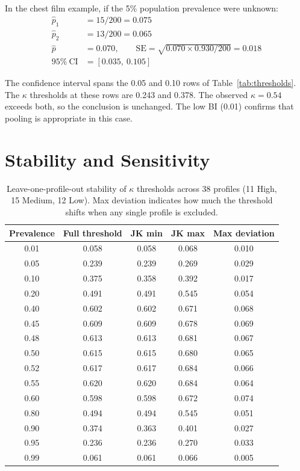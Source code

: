 \documentclass[11pt]{article}
\begin{document}
In the chest film example, if the 5\% population prevalence were unknown:
\begin{align*}
\hat{p}_1 &= 15/200 = 0.075 \\
\hat{p}_2 &= 13/200 = 0.065 \\
\hat{p} &= 0.070, \qquad \text{SE} = \sqrt{0.070 \times 0.930 / 200} = 0.018 \\
95\%\ \text{CI} &= [0.035,\ 0.105]
\end{align*}

\noindent The confidence interval spans the 0.05 and 0.10 rows of Table~\ref{tab:thresholds}. The $\kappa$ thresholds at these rows are 0.243 and 0.378. The observed $\kappa = 0.54$ exceeds both, so the conclusion is unchanged. The low BI (0.01) confirms that pooling is appropriate in this case.

\newpage
\section{Stability and Sensitivity}
\label{app:stability}

\begin{table}[h!]
\centering
\caption{Leave-one-profile-out stability of $\kappa$ thresholds across 38 profiles (11 High, 15 Medium, 12 Low). Max deviation indicates how much the threshold shifts when any single profile is excluded.}
\label{tab:jackknife}
\small
\begin{tabular}{ccccc}
\toprule
Prevalence & Full threshold & JK min & JK max & Max deviation \\
\midrule
0.01 & 0.058 & 0.058 & 0.068 & 0.010 \\
0.05 & 0.239 & 0.239 & 0.269 & 0.029 \\
0.10 & 0.375 & 0.358 & 0.392 & 0.017 \\
0.20 & 0.491 & 0.491 & 0.545 & 0.054 \\
0.40 & 0.602 & 0.602 & 0.671 & 0.068 \\
0.45 & 0.609 & 0.609 & 0.678 & 0.069 \\
0.48 & 0.613 & 0.613 & 0.681 & 0.067 \\
0.50 & 0.615 & 0.615 & 0.680 & 0.065 \\
0.52 & 0.617 & 0.617 & 0.684 & 0.066 \\
0.55 & 0.620 & 0.620 & 0.684 & 0.064 \\
0.60 & 0.598 & 0.598 & 0.672 & 0.074 \\
0.80 & 0.494 & 0.494 & 0.545 & 0.051 \\
0.90 & 0.374 & 0.363 & 0.401 & 0.027 \\
0.95 & 0.236 & 0.236 & 0.270 & 0.033 \\
0.99 & 0.061 & 0.061 & 0.066 & 0.005 \\
\bottomrule
\end{tabular}
\end{table}
\end{document}
